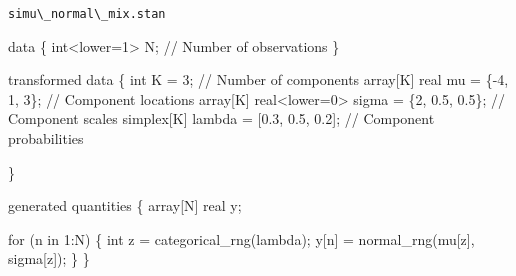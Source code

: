 \documentclass[
  letterpaper,
  DIV=11,
  numbers=noendperiod]{scrartcl}
\newenvironment{Shaded}{\begin{snugshade}}{\end{snugshade}}
\newcommand{\CommentTok}[1]{\textcolor[rgb]{0.37,0.37,0.37}{#1}}
\newcommand{\ControlFlowTok}[1]{\textcolor[rgb]{0.00,0.23,0.31}{#1}}
\newcommand{\DataTypeTok}[1]{\textcolor[rgb]{0.68,0.00,0.00}{#1}}
\newcommand{\DecValTok}[1]{\textcolor[rgb]{0.68,0.00,0.00}{#1}}
\newcommand{\FloatTok}[1]{\textcolor[rgb]{0.68,0.00,0.00}{#1}}
\newcommand{\KeywordTok}[1]{\textcolor[rgb]{0.00,0.23,0.31}{#1}}
\newcommand{\NormalTok}[1]{\textcolor[rgb]{0.00,0.23,0.31}{#1}}
\begin{document}
\begin{codelisting}

\caption{\texttt{simu\textbackslash\_normal\textbackslash\_mix.stan}}

\begin{Shaded}
\begin{Highlighting}[]
\KeywordTok{data}\NormalTok{ \{}
  \DataTypeTok{int}\NormalTok{\textless{}}\KeywordTok{lower}\NormalTok{=}\DecValTok{1}\NormalTok{\textgreater{} N;      }\CommentTok{// Number of observations}
\NormalTok{\}}

\KeywordTok{transformed data}\NormalTok{ \{}
  \DataTypeTok{int}\NormalTok{ K = }\DecValTok{3}\NormalTok{;                                    }\CommentTok{// Number of components}
  \DataTypeTok{array}\NormalTok{[K] }\DataTypeTok{real}\NormalTok{ mu = \{{-}}\DecValTok{4}\NormalTok{, }\DecValTok{1}\NormalTok{, }\DecValTok{3}\NormalTok{\};                }\CommentTok{// Component locations}
  \DataTypeTok{array}\NormalTok{[K] }\DataTypeTok{real}\NormalTok{\textless{}}\KeywordTok{lower}\NormalTok{=}\DecValTok{0}\NormalTok{\textgreater{} sigma = \{}\DecValTok{2}\NormalTok{, }\FloatTok{0.5}\NormalTok{, }\FloatTok{0.5}\NormalTok{\}; }\CommentTok{// Component scales}
  \DataTypeTok{simplex}\NormalTok{[K] lambda = [}\FloatTok{0.3}\NormalTok{, }\FloatTok{0.5}\NormalTok{, }\FloatTok{0.2}\NormalTok{]\textquotesingle{};         }\CommentTok{// Component probabilities}

\NormalTok{\}}

\KeywordTok{generated quantities}\NormalTok{ \{}
  \DataTypeTok{array}\NormalTok{[N] }\DataTypeTok{real}\NormalTok{ y;}

  \ControlFlowTok{for}\NormalTok{ (n }\ControlFlowTok{in} \DecValTok{1}\NormalTok{:N) \{}
    \DataTypeTok{int}\NormalTok{ z = categorical\_rng(lambda);}
\NormalTok{    y[n] = normal\_rng(mu[z], sigma[z]);}
\NormalTok{  \}}
\NormalTok{\}}
\end{Highlighting}
\end{Shaded}

\end{codelisting}
\end{document}
